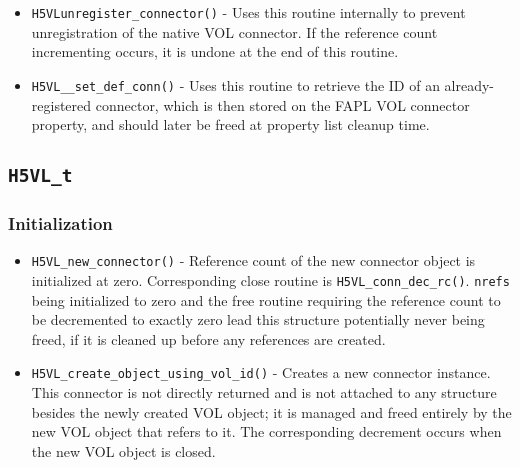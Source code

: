 \begin{itemize}
\begin{itemize}
        \item \texttt{H5VLunregister\_connector()} - Uses this routine internally to prevent unregistration of the native VOL connector. If the reference count incrementing occurs, it is undone at the end of this routine.
    
        \item \texttt{H5VL\_\_set\_def\_conn()} - Uses this routine to retrieve the ID of an already-registered connector, which is then stored on the FAPL VOL connector property, and should later be freed at property list cleanup time.
    \end{itemize}

\end{itemize}


\subsection{\texttt{H5VL\_t}}

\subsubsection{Initialization}
\begin{itemize}
    \item \texttt{H5VL\_new\_connector()} - Reference count of the new connector object is initialized at zero. Corresponding close routine is \texttt{H5VL\_conn\_dec\_rc()}. \texttt{nrefs} being initialized to zero and the free routine requiring the reference count to be decremented to exactly zero lead this structure potentially never being freed, if it is cleaned up before any references are created.
    
    \item \texttt{H5VL\_create\_object\_using\_vol\_id()} - Creates a new connector instance. This connector is not directly returned and is not attached to any structure besides the newly created VOL object; it is managed and freed entirely by the new VOL object that refers to it. The corresponding decrement occurs when the new VOL object is closed.
    
\end{itemize}

